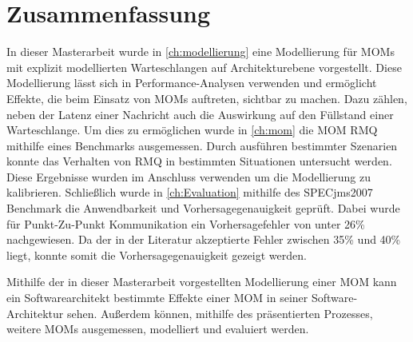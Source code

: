
\chapter{Zusammenfassung}
\label{ch:zusammenfassung}
In dieser Masterarbeit wurde in \autoref{ch:modellierung} eine Modellierung für MOMs mit explizit modellierten Warteschlangen auf Architekturebene vorgestellt. Diese Modellierung lässt sich in Performance-Analysen verwenden und ermöglicht Effekte, die beim Einsatz von MOMs auftreten, sichtbar zu machen. Dazu zählen, neben der Latenz einer Nachricht auch die Auswirkung auf den Füllstand einer Warteschlange. Um dies zu ermöglichen wurde in \autoref{ch:mom} die MOM RMQ mithilfe eines Benchmarks ausgemessen. Durch ausführen bestimmter Szenarien konnte das Verhalten von RMQ in bestimmten Situationen untersucht werden. Diese Ergebnisse wurden im Anschluss verwenden um die Modellierung zu kalibrieren. Schließlich wurde in \autoref{ch:Evaluation} mithilfe des SPECjms2007 Benchmark die Anwendbarkeit und Vorhersagegenauigkeit geprüft. Dabei wurde für Punkt-Zu-Punkt Kommunikation ein Vorhersagefehler von unter 26\% nachgewiesen. Da der in der Literatur akzeptierte Fehler zwischen 35\% und 40\% \cite{error} liegt, konnte somit die Vorhersagegenauigkeit gezeigt werden. \par
Mithilfe der in dieser Masterarbeit vorgestellten Modellierung einer MOM kann ein Softwarearchitekt bestimmte Effekte einer MOM in seiner Software-Architektur sehen. Außerdem können, mithilfe des präsentierten Prozesses, weitere MOMs ausgemessen, modelliert und evaluiert werden.  \par
